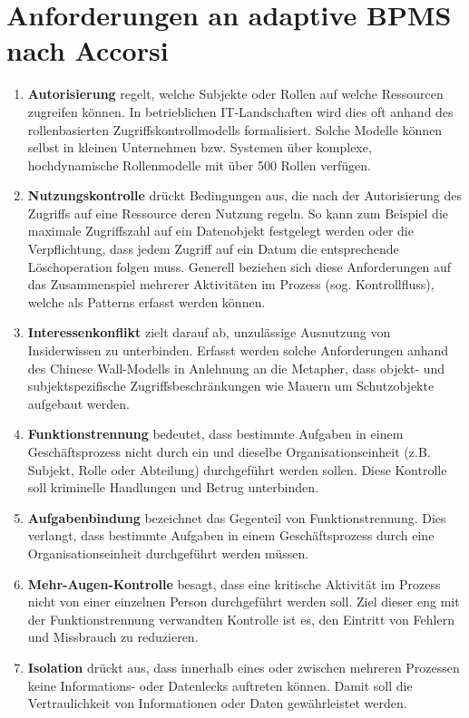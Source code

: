 \section{Anforderungen an adaptive BPMS nach Accorsi}
\begin{enumerate} %
\item \textbf{Autorisierung} regelt, welche Subjekte oder Rollen auf welche Ressourcen zugreifen können. In betrieblichen IT-Landschaften wird dies oft anhand des rollenbasierten Zugriffskontrollmodells formalisiert. Solche Modelle können selbst in kleinen Unternehmen bzw. Systemen über komplexe, hochdynamische Rollenmodelle mit über 500 Rollen verfügen.
 \item \textbf{Nutzungskontrolle} drückt Bedingungen aus, die nach der Autorisierung des Zugriffs auf eine Ressource deren Nutzung regeln. So kann zum Beispiel die maximale Zugriffszahl auf ein Datenobjekt festgelegt werden oder die Verpflichtung, dass jedem Zugriff auf ein Datum die entsprechende Löschoperation folgen muss. Generell beziehen sich diese Anforderungen auf das Zusammenspiel mehrerer Aktivitäten im Prozess (sog. Kontrollfluss), welche als Patterns erfasst werden können.
 \item \textbf{Interessenkonflikt} zielt darauf ab, unzulässige Ausnutzung von Insiderwissen zu unterbinden. Erfasst werden solche Anforderungen anhand des Chinese Wall-Modells in Anlehnung an die Metapher, dass objekt- und subjektspezifische Zugriffsbeschränkungen wie Mauern um Schutzobjekte aufgebaut werden. 
 \item \textbf{Funktionstrennung} bedeutet, dass bestimmte Aufgaben in einem Geschäftsprozess nicht durch ein und dieselbe Organisationseinheit (z.B. Subjekt, Rolle oder Abteilung) durchgeführt werden sollen. Diese Kontrolle soll kriminelle Handlungen und Betrug unterbinden.
 \item \textbf{Aufgabenbindung} bezeichnet das Gegenteil von Funktionstrennung. Dies verlangt, dass bestimmte Aufgaben in einem Geschäftsprozess durch eine Organisationseinheit durchgeführt werden müssen.
 \item \textbf{Mehr-Augen-Kontrolle} besagt, dass eine kritische Aktivität im Prozess nicht von einer einzelnen Person durchgeführt werden soll. Ziel dieser eng mit der Funktionstrennung verwandten Kontrolle ist es, den Eintritt von Fehlern und Missbrauch zu reduzieren.
 \item \textbf{Isolation} drückt aus, dass innerhalb eines oder zwischen mehreren Prozessen keine Informations- oder Datenlecks auftreten können. Damit soll die Vertraulichkeit von Informationen oder Daten gewährleistet werden.
 \end{enumerate}